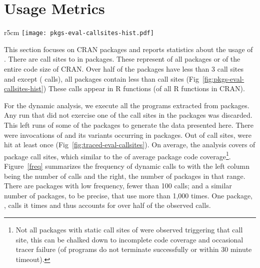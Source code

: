 \documentclass[screen,acmsmall]{acmart}
\begin{document}
\newpage

\section{Usage Metrics}

\begin{wrapfigure}{r}{5cm} \hspace*{-12mm}
  \centering
  \texttt{[image: pkgs-eval-callsites-hist.pdf]} \caption{CRAN
  \eval call sites}%
  \label{fig:pkgs-eval-callsites-hist}
\end{wrapfigure}
%
This section focuses on CRAN packages and reports statistics about the usage of
\eval. There are \PkgEvalCallSites call sites to \eval in \PkgPackages
packages.  These represent \PkgPackagesRatio of all packages or \PkgCodeRatio
of the entire code size of CRAN. Over half of the packages have less than 3
\eval call sites and except \MaxEvalCallSitesPackage (\MaxEvalCallSitesCount
\eval calls), all packages contain less than \MaxEvalCallSitesRest \eval call
sites (\cf Fig~\ref{fig:pkgs-eval-callsites-hist}) These \eval calls appear in
\PkgFunsWithEval R functions (\CranFunsWithEvalRatio of all R functions in
CRAN).

For the dynamic analysis, we execute all the \CranRunnableScripts programs
extracted from \CranPackages packages. Any run that did not exercise one of the
\eval call sites in the packages was discarded. This left \Nbruns runs of some
of the \Corpus packages to generate the data presented here. There were
\Allcalls invocations of \eval and its variants occurring in \Triggeredpkgs
packages. Out of \PkgEvalCallSitesRnd \eval call sites, \PkgHitEvalCallSites
were hit at least once (\cf Fig~\ref{fig:traced-eval-callsites}). On average,
the analysis covers \PkgHitEvalCallSitesAvgRatio of package \eval call sites,
which similar to the \PkgCodeCoverage of average package code
coverage\footnote{Not all packages with static call sites of \eval were
observed triggering that call site, this can be chalked down to incomplete code
coverage and occasional tracer failure (\PkgFailedProgramsRatio of programs do
not terminate successfully or within 30 minute timeout).}.  Figure~\ref{freq}
summarizes the frequency of dynamic calls to \eval with the left column being
the number of calls and the right, the number of packages in that range. There
are \Fewcalls packages with low \eval frequency, fewer than 100 calls; and a
similar number of packages, \Manycalls to be precise, that use \eval more than
1,000 times.  One package, \Maxcallspack, calls it \Maxcalls times and thus
accounts for over half of the observed calls.
\end{document}
